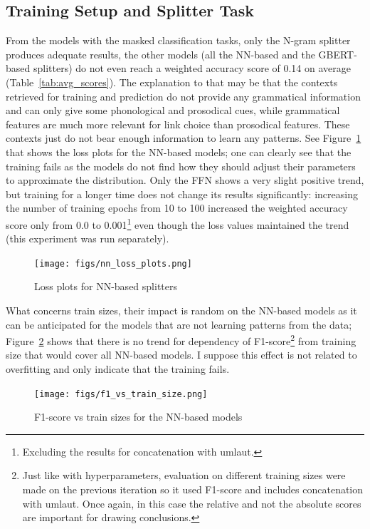 \documentclass[11pt]{article}
\begin{document}
\subsection{Training Setup and Splitter Task}

From the models with the masked classification tasks, only the N-gram splitter produces adequate results, the other models (all the NN-based and the GBERT-based splitters) do not even reach a weighted accuracy score of 0.14 on average (Table~\ref{tab:avg_scores}). The explanation to that may be that the contexts retrieved for training and prediction do not provide any grammatical information and can only give some phonological and prosodical cues, while grammatical features are much more relevant for link choice than prosodical features. These contexts just do not bear enough information to learn any patterns. See Figure~\ref{fig:losses} that shows the loss plots for the NN-based models; one can clearly see that the training fails as the models do not find how they should adjust their parameters to approximate the distribution. Only the FFN shows a very slight positive trend, but training for a longer time does not change its results significantly: increasing the number of training epochs from 10 to 100 increased the weighted accuracy score only from 0.0 to 0.001\footnote{Excluding the results for concatenation with umlaut.} even though the loss values maintained the trend (this experiment was run separately).

\begin{figure}[hbt!]
    \centering
    \texttt{[image: figs/nn\_loss\_plots.png]}
    \caption{Loss plots for NN-based splitters}
    \label{fig:losses}
\end{figure}

What concerns train sizes, their impact is random on the NN-based models as it can be anticipated for the models that are not learning patterns from the data; Figure~\ref{fig:train_sizes} shows that there is no trend for dependency of F1-score\footnote{Just like with hyperparameters, evaluation on different training sizes were made on the previous iteration so it used F1-score and includes concatenation with umlaut. Once again, in this case the relative and not the absolute scores are important for drawing conclusions.} from training size that would cover all NN-based models. I suppose this effect is not related to overfitting and only indicate that the training fails.

\begin{figure}[hbt]
    \centering
    \texttt{[image: figs/f1\_vs\_train\_size.png]}
    \caption{F1-score vs train sizes for the NN-based models}
    \label{fig:train_sizes}
\end{figure}
\end{document}
